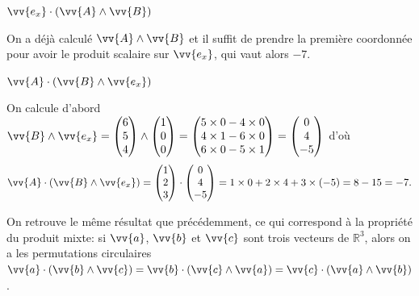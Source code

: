 
\begin{enonce}
$\vv{e_x}\cdot(\vv{A}\wedge\vv{B})$
\end{enonce}


\begin{corrige}
On a déjà calculé $\vv{A}\wedge\vv{B}$ et il suffit de prendre la première coordonnée pour avoir le produit scalaire sur $\vv{e_x}$, qui vaut alors $-7$.
\end{corrige}

\begin{enonce}
$\vv{A}\cdot(\vv{B}\wedge\vv{e_x})$
\end{enonce}


\begin{corrige}
    On calcule d'abord
	$
    \vv{B}\wedge\vv{e_x} = 
	\begin{pmatrix}
		6 \\ 5 \\ 4
	\end{pmatrix}\wedge
	\begin{pmatrix}
		1 \\ 0 \\ 0
	\end{pmatrix}
	=
	\begin{pmatrix}
		5\times0 - 4\times0 \\
		4\times1 - 6\times0	\\
		6\times0 - 5\times1
	\end{pmatrix}
	=
	\begin{pmatrix}
		0 \\ 4 \\ -5
	\end{pmatrix}
	$ d'où 
	\[
	\vv{A}\cdot(\vv{B}\wedge\vv{e_x}) = 
    \begin{pmatrix} 1 \\ 2 \\ 3 \end{pmatrix} \cdot \begin{pmatrix} 0 \\ 4 \\ -5 \end{pmatrix}
     = 1\times0 + 2\times4 + 3\times(-5) = 8 - 15 = -7.
     \] 
     
    On retrouve le même résultat que précédemment, ce qui correspond à la propriété du produit mixte: si $\vv{a}$, $\vv{b}$ et $\vv{c}$ sont trois vecteurs de $\mathbb{R}^3$, alors on a les permutations circulaires $\vv{a}\cdot(\vv{b}\wedge\vv{c}) = \vv{b}\cdot(\vv{c}\wedge\vv{a}) = \vv{c}\cdot(\vv{a}\wedge\vv{b})$.
\end{corrige}

